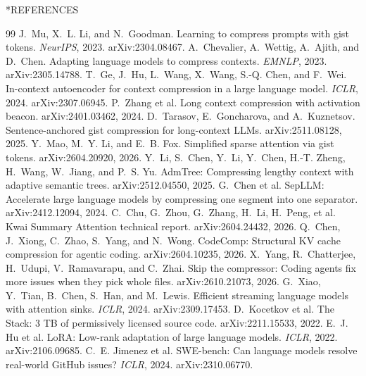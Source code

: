 \documentclass[10pt,twocolumn]{article}
\makeatletter
\renewcommand{\section}{\@startsection{section}{1}{\z@}{12pt}{4pt}{\normalfont\normalsize\bfseries\MakeUppercase}}
\makeatother
\begin{document}
\section*{REFERENCES}
\begingroup\renewcommand{\section}[2]{}\small
\begin{thebibliography}{99}
J.~Mu, X.~L. Li, and N.~Goodman. Learning to compress prompts with gist tokens.
\emph{NeurIPS}, 2023. arXiv:2304.08467.
A.~Chevalier, A.~Wettig, A.~Ajith, and D.~Chen. Adapting language models to
compress contexts. \emph{EMNLP}, 2023. arXiv:2305.14788.
T.~Ge, J.~Hu, L.~Wang, X.~Wang, S.-Q. Chen, and F.~Wei. In-context autoencoder
for context compression in a large language model. \emph{ICLR}, 2024.
arXiv:2307.06945.
P.~Zhang et al. Long context compression with activation beacon.
arXiv:2401.03462, 2024.
D.~Tarasov, E.~Goncharova, and A.~Kuznetsov. Sentence-anchored gist
compression for long-context LLMs. arXiv:2511.08128, 2025.
Y.~Mao, M.~Y. Li, and E.~B. Fox. Simplified sparse attention via gist tokens.
arXiv:2604.20920, 2026.
Y.~Li, S.~Chen, Y.~Li, Y.~Chen, H.-T. Zheng, H.~Wang, W.~Jiang, and P.~S. Yu.
AdmTree: Compressing lengthy context with adaptive semantic trees.
arXiv:2512.04550, 2025.
G.~Chen et al. SepLLM: Accelerate large language models by compressing one
segment into one separator. arXiv:2412.12094, 2024.
C.~Chu, G.~Zhou, G.~Zhang, H.~Li, H.~Peng, et al. Kwai Summary Attention
technical report. arXiv:2604.24432, 2026.
Q.~Chen, J.~Xiong, C.~Zhao, S.~Yang, and N.~Wong. CodeComp: Structural KV
cache compression for agentic coding. arXiv:2604.10235, 2026.
X.~Yang, R.~Chatterjee, H.~Udupi, V.~Ramavarapu, and C.~Zhai. Skip the
compressor: Coding agents fix more issues when they pick whole files.
arXiv:2610.21073, 2026.
G.~Xiao, Y.~Tian, B.~Chen, S.~Han, and M.~Lewis. Efficient streaming language
models with attention sinks. \emph{ICLR}, 2024. arXiv:2309.17453.
D.~Kocetkov et al. The Stack: 3 TB of permissively licensed source code.
arXiv:2211.15533, 2022.
E.~J. Hu et al. LoRA: Low-rank adaptation of large language models.
\emph{ICLR}, 2022. arXiv:2106.09685.
C.~E. Jimenez et al. SWE-bench: Can language models resolve real-world GitHub
issues? \emph{ICLR}, 2024. arXiv:2310.06770.
\end{thebibliography}
\endgroup
\end{document}
